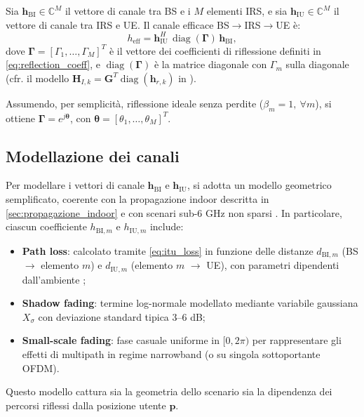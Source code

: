 \documentclass[12pt,a4paper]{report}
\begin{document}
Sia $\mathbf{h}_{\mathrm{BI}} \in \mathbb{C}^{M}$ il vettore di
canale tra BS e i $M$ elementi IRS, e sia $\mathbf{h}_{\mathrm{IU}}
\in \mathbb{C}^{M}$ il vettore di canale tra IRS e UE. Il canale
efficace BS$\to$IRS$\to$UE è:
\begin{equation}
  h_{\mathrm{eff}} =
  \mathbf{h}_{\mathrm{IU}}^{H}\,
  \operatorname{diag}(\boldsymbol{\Gamma})\,
  \mathbf{h}_{\mathrm{BI}},
  \label{eq:heff}
\end{equation}
dove $\boldsymbol{\Gamma}=[\Gamma_1,\dots,\Gamma_M]^T$ è il vettore
dei coefficienti di riflessione definiti in
\eqref{eq:reflection_coeff}, e
$\operatorname{diag}(\boldsymbol{\Gamma})$ è la matrice diagonale con
$\Gamma_m$ sulla diagonale (cfr. il modello
  $\mathbf{H}_{I,k}=\mathbf{G}^T\operatorname{diag}(\mathbf{h}_{r,k})$ in
\cite{guo2021cascaded}).

Assumendo, per semplicità, riflessione ideale senza perdite
($\beta_m=1,\ \forall m$), si ottiene
$\boldsymbol{\Gamma}=e^{j\boldsymbol{\theta}}$, con
$\boldsymbol{\theta}=[\theta_1,\dots,\theta_M]^T$.

\subsection{Modellazione dei canali}
Per modellare i vettori di canale $\mathbf{h}_{\mathrm{BI}}$ e
$\mathbf{h}_{\mathrm{IU}}$, si adotta un modello geometrico
semplificato, coerente con la propagazione indoor descritta in
\cref{sec:propagazione_indoor} e con scenari sub-6 GHz non sparsi
\cite{guo2021cascaded}. In particolare, ciascun coefficiente
$h_{\mathrm{BI},m}$ e $h_{\mathrm{IU},m}$ include:

\begin{itemize}
  \item \textbf{Path loss}: calcolato tramite \eqref{eq:itu_loss} in
    funzione delle distanze $d_{\mathrm{BI},m}$ (BS $\rightarrow$
    elemento $m$) e $d_{\mathrm{IU},m}$ (elemento $m$ $\rightarrow$ UE),
    con parametri dipendenti dall'ambiente \cite{itu_p1238_2025};
  \item \textbf{Shadow fading}: termine log-normale modellato mediante
    variabile gaussiana $X_\sigma$ con deviazione standard tipica 3--6 dB;
  \item \textbf{Small-scale fading}: fase casuale uniforme in
    $[0,2\pi)$ per rappresentare gli effetti di multipath in regime
    narrowband (o su singola sottoportante OFDM).
\end{itemize}

Questo modello cattura sia la geometria dello scenario sia la
dipendenza dei percorsi riflessi dalla posizione utente $\mathbf{p}$.
\end{document}
